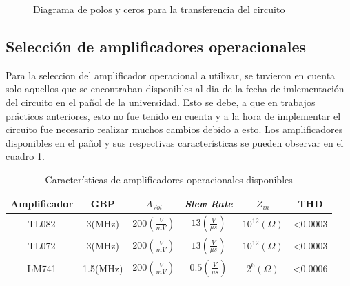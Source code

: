 \begin{center}
\begin{figure}[H]
\begin{centering}
\par\end{centering}
\centering{}\caption{Diagrama de polos y ceros para la transferencia del circuito}
\end{figure}
\par\end{center}

\subsection{Selección de amplificadores operacionales}

Para la seleccion del amplificador operacional a utilizar, se tuvieron
en cuenta solo aquellos que se encontraban disponibles al dia de la
fecha de imlementación del circuito en el pañol de la universidad.
Esto se debe, a que en trabajos prácticos anteriores, esto no fue
tenido en cuenta y a la hora de implementar el circuito fue necesario
realizar muchos cambios debido a esto. Los amplificadores disponibles
en el pañol y sus respectivas características se pueden observar en
el cuadro \ref{1_8}.

\begin{table}[h]
\begin{centering}
\begin{tabular}{|c|c|c|c|c|c|}
\hline 
Amplificador & GBP & $A_{Vol}$ & \emph{Slew Rate} & $Z_{in}$ & THD\tabularnewline
\hline 
\hline 
TL082 & 3(MHz) & 200$\left(\frac{V}{mV}\right)$ & $13(\frac{V}{\mu s})$ & $10^{12}(\Omega)$ & <0.0003\tabularnewline
\hline 
TL072 & 3(MHz) & 200$\left(\frac{V}{mV}\right)$ & $13(\frac{V}{\mu s})$ & $10^{12}(\Omega)$ & <0.0003\tabularnewline
\hline 
LM741 & 1.5(MHz) & 200$\left(\frac{V}{mV}\right)$ & $0.5(\frac{V}{\mu s})$ & $2^{6}(\Omega)$ & <0.0006\tabularnewline
\hline 
\end{tabular}
\par\end{centering}
\caption{Características de amplificadores operacionales disponibles}
\label{1_8}
\end{table}

